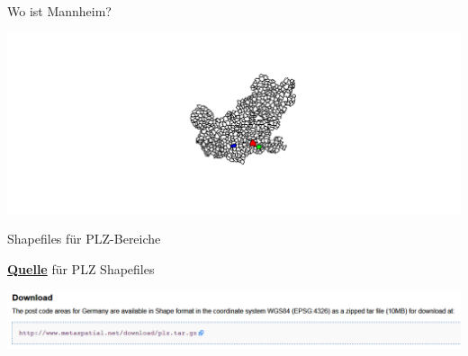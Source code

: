 \documentclass[ignorenonframetext,]{beamer}
\newenvironment{Shaded}{\begin{snugshade}}{\end{snugshade}}
\newcommand{\DataTypeTok}[1]{\textcolor[rgb]{0.13,0.29,0.53}{#1}}
\newcommand{\KeywordTok}[1]{\textcolor[rgb]{0.13,0.29,0.53}{\textbf{#1}}}
\newcommand{\NormalTok}[1]{#1}
\newcommand{\OperatorTok}[1]{\textcolor[rgb]{0.81,0.36,0.00}{\textbf{#1}}}
\newcommand{\StringTok}[1]{\textcolor[rgb]{0.31,0.60,0.02}{#1}}
\begin{document}
\begin{frame}[fragile]{Wo ist Mannheim?}
\protect\hypertarget{wo-ist-mannheim}{}

\begin{Shaded}
\end{Shaded}

\includegraphics{A6_Shapefiles_files/figure-beamer/unnamed-chunk-11-1.pdf}

\end{frame}

\begin{frame}{Shapefiles für PLZ-Bereiche}
\protect\hypertarget{shapefiles-fur-plz-bereiche}{}

\begin{block}{\href{http://arnulf.us/PLZ}{\textbf{Quelle}} für PLZ
Shapefiles}

\includegraphics{figure/Download_plz.PNG}

\end{block}

\end{frame}
\end{document}
